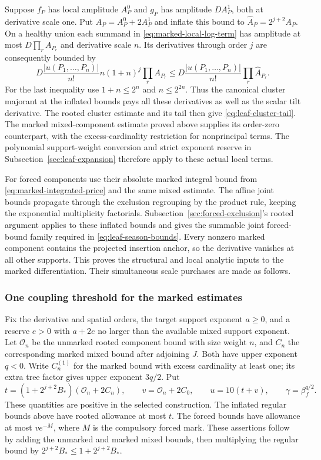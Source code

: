 Suppose $f_P$ has local amplitude $A_P^0$ and $g_P$ has amplitude
$D A_P^1$, both at derivative scale one. Put
$A_P=A_P^0+2A_P^1$ and inflate this bound to
$\widehat A_P=2^{j+2}A_P$. On a healthy union each summand in
\eqref{eq:marked-local-log-term} has amplitude at most
$D\prod_r A_{P_r}$ and derivative scale $n$. Its derivatives
through order $j$ are consequently bounded by
\[
 D\frac{|u(P_1,\ldots,P_n)|}{n!}
                     n(1+n)^j\prod_r A_{P_r}
 \le D\frac{|u(P_1,\ldots,P_n)|}{n!}
                                      \prod_r\widehat A_{P_r}.
\]
For the last inequality use $1+n\le2^n$ and $n\le2^{2n}$.
Thus the canonical cluster majorant at the inflated bounds pays
all these derivatives as well as the scalar tilt derivative.
The rooted cluster estimate and its tail then give
\eqref{eq:leaf-cluster-tail}. The marked mixed-component estimate
proved above supplies its order-zero counterpart, with the
excess-cardinality restriction for nonprincipal terms. The
polynomial support-weight conversion and strict exponent reserve
in Subsection~\ref{sec:leaf-expansion} therefore apply to these
actual local terms.

For forced components use their absolute marked integral bound
from \eqref{eq:marked-integrated-price} and the same mixed estimate.
The affine joint bounds propagate through the exclusion
regrouping by the product rule, keeping the exponential
multiplicity factorials. Subsection~\ref{sec:forced-exclusion}'s
rooted argument applies to these inflated bounds and gives the
summable joint forced-bound family required in
\eqref{eq:leaf-season-bounds}. Every nonzero marked component
contains the projected insertion anchor, so the derivative vanishes
at all other supports. This proves the structural and local
analytic inputs to the marked differentiation. Their simultaneous
scale purchases are made as follows.

\subsubsection{One coupling threshold for the marked estimates}
Fix the derivative and spatial orders, the target support exponent
$a\ge0$, and a reserve $e>0$ with $a+2e$ no larger than the
available mixed support exponent. Let $\mathcal O_n$ be the
unmarked rooted component bound with size weight $n$, and $C_n$
the corresponding marked mixed bound after adjoining $J$. Both
have upper exponent $q<0$. Write $C_n^{(1)}$ for the marked bound
with excess cardinality at least one; its extra tree factor gives
upper exponent $3q/2$. Put
\[
 t=(1+2^{j+2}B_*)(\mathcal O_n+2C_n),\qquad
 v=\mathcal O_n+2C_0,\qquad u=10(t+v),
 \qquad \gamma=\beta_f^{q/2}.
\]
These quantities are positive in the selected construction. The
inflated regular bounds above have rooted allowance at most $t$.
The forced bounds have allowance at most $v e^{-M}$, where $M$
is the compulsory forced mark. These assertions follow by adding
the unmarked and marked mixed bounds, then multiplying the
regular bound by $2^{j+2}B_*\le1+2^{j+2}B_*$.

